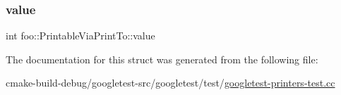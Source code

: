 \subsubsection{\texorpdfstring{value}{value}}
{\footnotesize\ttfamily int foo\+::\+Printable\+Via\+Print\+To\+::value}



The documentation for this struct was generated from the following file\+:\begin{DoxyCompactItemize}
\item 
cmake-\/build-\/debug/googletest-\/src/googletest/test/\mbox{\hyperlink{googletest-printers-test_8cc}{googletest-\/printers-\/test.\+cc}}\end{DoxyCompactItemize}
